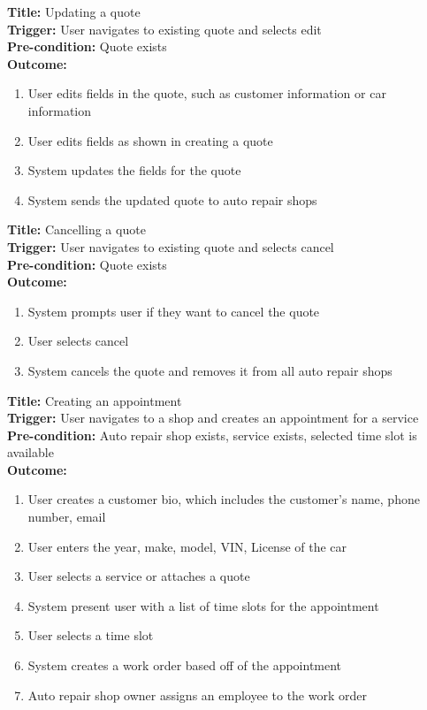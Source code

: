 \documentclass[12pt]{article}
\begin{document}
\textbf{Title:} Updating a quote\\
\textbf{Trigger:} User navigates to existing quote and selects edit\\
\textbf{Pre-condition:} Quote exists\\
\textbf{Outcome:}
\begin{enumerate}
	\item User edits fields in the quote, such as customer information or car information
	\item User edits fields as shown in creating a quote
	\item System updates the fields for the quote
	\item System sends the updated quote to auto repair shops
\end{enumerate}

\textbf{Title:} Cancelling a quote\\
\textbf{Trigger:} User navigates to existing quote and selects cancel\\
\textbf{Pre-condition:} Quote exists\\
\textbf{Outcome:}
\begin{enumerate}
	\item System prompts user if they want to cancel the quote
	\item User selects cancel
	\item System cancels the quote and removes it from all auto repair shops
\end{enumerate}

\textbf{Title:} Creating an appointment\\
\textbf{Trigger:} User navigates to a shop and creates an appointment for a service\\
\textbf{Pre-condition:} Auto repair shop exists, service exists, selected time slot is available\\
\textbf{Outcome:}
\begin{enumerate}
	\item User creates a customer bio, which includes the customer's name, phone number, email
	\item User enters the year, make, model, VIN, License of the car
	\item User selects a service or attaches a quote
	\item System present user with a list of time slots for the appointment
	\item User selects a time slot
	\item System creates a work order based off of the appointment
	\item Auto repair shop owner assigns an employee to the work order
\end{enumerate}
\end{document}
